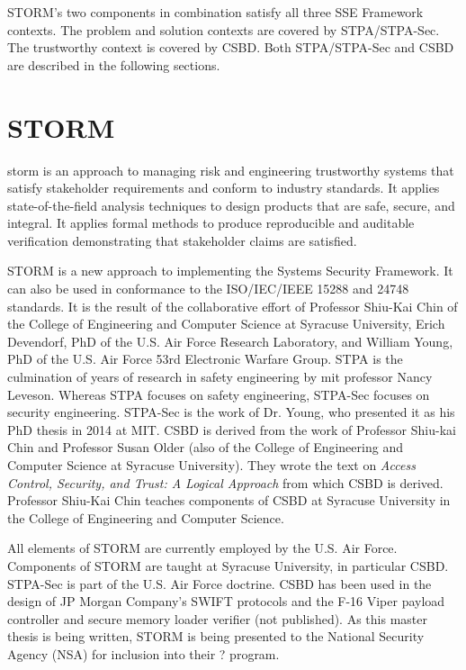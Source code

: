 \documentclass[../../main/main.tex]{subfiles}
\begin{document}
STORM's two components in combination satisfy all three SSE Framework contexts.  The problem and solution contexts are covered by STPA/STPA-Sec.  The trustworthy context is covered by CSBD.  Both STPA/STPA-Sec and CSBD are described in the following sections.


\section{STORM}\label{sec:storm}

\Gls{storm} is an approach to managing risk and engineering trustworthy systems that satisfy stakeholder requirements and conform to industry standards.  It applies state-of-the-field analysis techniques to design products that are safe, secure, and integral.  It applies formal methods to produce reproducible and auditable verification demonstrating that stakeholder claims are satisfied.  


STORM is a new approach to implementing the Systems Security Framework.  It can also be used in conformance to the ISO/IEC/IEEE 15288 and 24748 standards.  It is the result of the collaborative effort of Professor Shiu-Kai Chin of the College of Engineering and Computer Science at Syracuse University, Erich Devendorf, PhD of the U.S. Air Force Research Laboratory, and William Young, PhD of the U.S. Air Force 53rd Electronic Warfare Group.  STPA is the culmination of years of research in safety engineering by \Gls{mit} professor Nancy Leveson.  Whereas STPA focuses on safety engineering, STPA-Sec focuses on security engineering.  STPA-Sec is the work of Dr. Young, who presented it as his PhD thesis in 2014 at MIT.  CSBD is derived from the work of Professor Shiu-kai Chin and Professor Susan Older (also of the College of Engineering and Computer Science at Syracuse University).  They wrote the text on \textit{Access Control, Security, and Trust: A Logical Approach} \cite{ChinOlder} from which CSBD is derived.  Professor Shiu-Kai Chin teaches components of CSBD at Syracuse University in the College of Engineering and Computer Science.  


All elements of STORM are currently employed by the U.S. Air Force.  Components of STORM are taught at Syracuse University, in particular CSBD.  STPA-Sec is part of the U.S. Air Force doctrine.  CSBD has been used in the design of JP Morgan Company's SWIFT protocols \cite{pkm} and the F-16 Viper payload controller and secure memory loader verifier (not published). As this master thesis is being written, STORM is being presented to the National Security Agency (NSA) for inclusion into their ? program.
\end{document}
